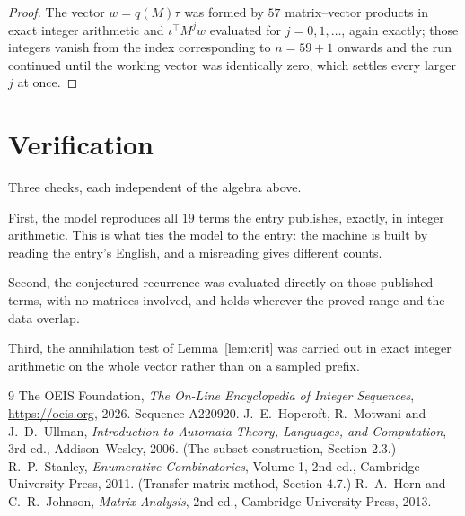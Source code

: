 \documentclass[11pt,a4paper]{article}
\theoremstyle{plain}
\theoremstyle{definition}
\begin{document}
\begin{proof}
The vector $w=q(M)\tau$ was formed by $57$ matrix--vector products in exact integer
arithmetic and $\iota^{\!\top}M^{j}w$ evaluated for $j=0,1,\dots$, again exactly; those
integers vanish from the index corresponding to $n=59+1$ onwards and the run continued
until the working vector was identically zero, which settles every larger $j$ at once.
\end{proof}

\section{Verification}

Three checks, each independent of the algebra above.

First, the model reproduces all $19$ terms the entry publishes, exactly, in integer
arithmetic. This is what ties the model to the entry: the machine is built by reading the
entry's English, and a misreading gives different counts.

Second, the conjectured recurrence was evaluated directly on those published terms, with no
matrices involved, and holds wherever the proved range and the data overlap.

Third, the annihilation test of Lemma~\ref{lem:crit} was carried out in exact integer
arithmetic on the whole vector rather than on a sampled prefix.

\begin{thebibliography}{9}
 The OEIS Foundation, \emph{The On-Line Encyclopedia of Integer
Sequences}, \url{https://oeis.org}, 2026. Sequence A220920.
 J.~E.~Hopcroft, R.~Motwani and J.~D.~Ullman, \emph{Introduction to Automata
Theory, Languages, and Computation}, 3rd ed., Addison--Wesley, 2006. (The subset
construction, Section 2.3.)
 R.~P.~Stanley, \emph{Enumerative Combinatorics}, Volume 1, 2nd ed.,
Cambridge University Press, 2011. (Transfer-matrix method, Section 4.7.)
 R.~A.~Horn and C.~R.~Johnson, \emph{Matrix Analysis}, 2nd ed., Cambridge
University Press, 2013.
\end{thebibliography}
\end{document}
